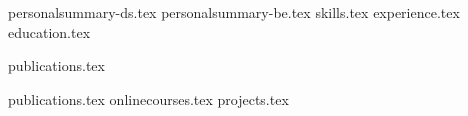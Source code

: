 \documentclass[12pt, a4paper]{awesome-cv}
\newcommand*{\sectiondir}{resume/}
\newcommand{\comment}[1]{}
\newcounter{ds_or_be}
\newcounter{res_cv}
\begin{document}
\makecvheader

{
{personalsummary-ds.tex}
}
{
{personalsummary-be.tex}
}
{skills.tex}
{experience.tex}
{education.tex}

{
{publications.tex}
\comment{\pagebreak}
}
{
{publications.tex}
{onlinecourses.tex}
{projects.tex}
}
\end{document}
